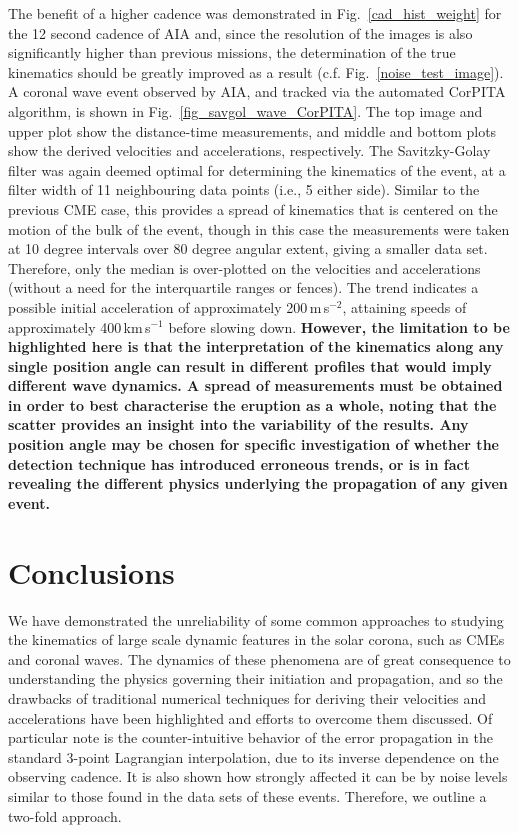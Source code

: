 \documentclass[structabstract]{aa}
\begin{document}
The benefit of a higher cadence was demonstrated in Fig.~\ref{cad_hist_weight} for the 12 second cadence of AIA and, since the resolution of the images is also significantly higher than previous missions, the determination of the true kinematics should be greatly improved as a result (c.f. Fig.~\ref{noise_test_image}). A coronal wave event observed by AIA, and tracked via the automated CorPITA algorithm, is shown in Fig.~\ref{fig_savgol_wave_CorPITA}. The top image and upper plot show the distance-time measurements, and middle and bottom plots show the derived velocities and accelerations, respectively. The Savitzky-Golay filter was again deemed optimal for determining the kinematics of the event, at a filter width of 11 neighbouring data points (i.e., 5 either side). Similar to the previous CME case, this provides a spread of kinematics that is centered on the motion of the bulk of the event, though in this case the measurements were taken at 10 degree intervals over 80 degree angular extent, giving a smaller data set. Therefore, only the median is over-plotted on the velocities and accelerations (without a need for the interquartile ranges or fences). The trend indicates a possible initial acceleration of approximately 200\,m\,s$^{-2}$, attaining speeds of approximately 400\,km\,s$^{-1}$ before slowing down. {\bf However, the limitation to be highlighted here is that the interpretation of the kinematics along any single position angle can result in different profiles that would imply different wave dynamics. A spread of measurements must be obtained in order to best characterise the eruption as a whole, noting that the scatter provides an insight into the variability of the results. Any position angle may be chosen for specific investigation of whether the detection technique has introduced erroneous trends, or is in fact revealing the different physics underlying the propagation of any given event.}


\section{Conclusions}
\label{sect:conclusions}

We have demonstrated the unreliability of some common approaches to studying the kinematics of large scale dynamic features in the solar corona, such as CMEs and coronal waves. The dynamics of these phenomena are of great consequence to understanding the physics governing their initiation and propagation, and so the drawbacks of traditional numerical techniques for deriving their velocities and accelerations have been highlighted and efforts to overcome them discussed. Of particular note is the counter-intuitive behavior of the error propagation in the standard 3-point Lagrangian interpolation, due to its inverse dependence on the observing cadence. It is also shown how strongly affected it can be by noise levels similar to those found in the data sets of these events. Therefore, we outline a two-fold approach.
\end{document}
